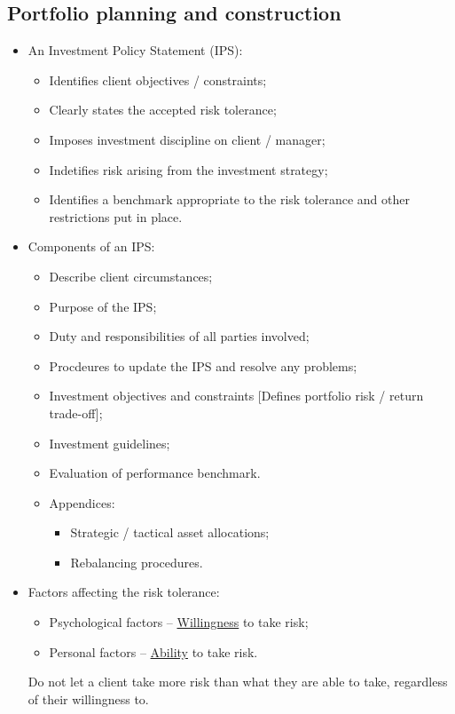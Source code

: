 \documentclass[../notes_compiled.tex]{subfiles}
\begin{document}
\subsection{Portfolio planning and construction}
\begin{itemize}
\item An Investment Policy Statement (IPS):
\begin{itemize}
\item Identifies client objectives / constraints;
\item Clearly states the accepted risk tolerance;
\item Imposes investment discipline on client / manager;
\item Indetifies risk arising from the investment strategy;
\item Identifies a benchmark appropriate to the risk tolerance and other restrictions put in place.
\end{itemize}
\item Components of an IPS:
\begin{itemize}
\item Describe client circumstances;
\item Purpose of the IPS;
\item Duty and responsibilities of all parties involved;
\item Procdeures to update the IPS and resolve any problems;
\item Investment objectives and constraints [Defines portfolio risk / return trade-off];
\item Investment guidelines;
\item Evaluation of performance benchmark.
\item Appendices:
\begin{itemize}
\item Strategic / tactical asset allocations;
\item Rebalancing procedures.
\end{itemize}
\end{itemize}
\item Factors affecting the risk tolerance:
\begin{itemize}
\item Psychological factors -- \underline{Willingness} to take risk;
\item Personal factors -- \underline{Ability} to take risk.
\end{itemize}
Do not let a client take more risk than what they are able to take, regardless of their willingness to.

\end{itemize}
\end{document}

